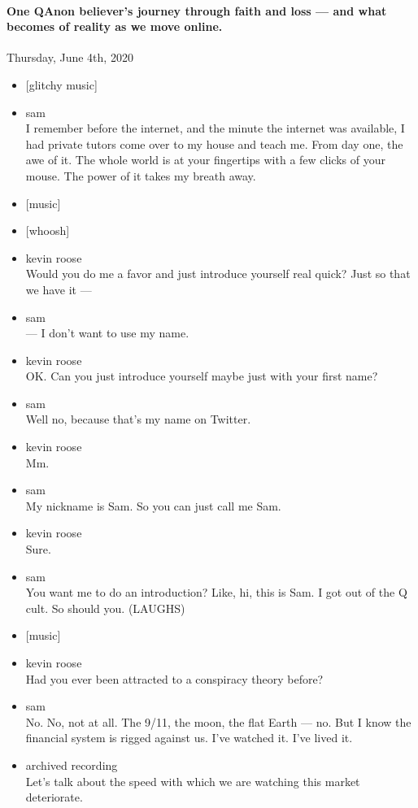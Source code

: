 \hypertarget{one-qanon-believers-journey-through-faith-and-loss--and-what-becomes-of-reality-as-we-move-online}{%
\paragraph{One QAnon believer's journey through faith and loss --- and
what becomes of reality as we move
online.}\label{one-qanon-believers-journey-through-faith-and-loss--and-what-becomes-of-reality-as-we-move-online}}

Thursday, June 4th, 2020

\begin{itemize}
\item
  {[}glitchy music{]}
\item
  sam\\
  I remember before the internet, and the minute the internet was
  available, I had private tutors come over to my house and teach me.
  From day one, the awe of it. The whole world is at your fingertips
  with a few clicks of your mouse. The power of it takes my breath away.
\item
  {[}music{]}
\item
  {[}whoosh{]}
\item
  kevin roose\\
  Would you do me a favor and just introduce yourself real quick? Just
  so that we have it ---
\item
  sam\\
  --- I don't want to use my name.
\item
  kevin roose\\
  OK. Can you just introduce yourself maybe just with your first name?
\item
  sam\\
  Well no, because that's my name on Twitter.
\item
  kevin roose\\
  Mm.
\item
  sam\\
  My nickname is Sam. So you can just call me Sam.
\item
  kevin roose\\
  Sure.
\item
  sam\\
  You want me to do an introduction? Like, hi, this is Sam. I got out of
  the Q cult. So should you. (LAUGHS)
\item
  {[}music{]}
\item
  kevin roose\\
  Had you ever been attracted to a conspiracy theory before?
\item
  sam\\
  No. No, not at all. The 9/11, the moon, the flat Earth --- no. But I
  know the financial system is rigged against us. I've watched it. I've
  lived it.
\item
  archived recording\\
  Let's talk about the speed with which we are watching this market
  deteriorate.
\end{itemize}

